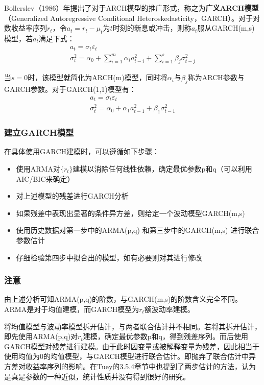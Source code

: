 \documentclass[11pt]{article}
\begin{document}
Bollerslev（1986）年提出了对于ARCH模型的推广形式，称之为\textbf{广义ARCH模型}（Generalized Autoregressive Conditional Heteroskedasticity，GARCH）。对于对数收益率序列$r_t$，令$a_t = r_t - \mu_t$为$t$时刻的新息或冲击，则称$a_t$服从GARCH(m,s)模型，若$a_t$满足下式：
\begin{gather*}
    a_t = \sigma_t \varepsilon_t \\
    \sigma_{t}^{2} = \alpha_0 + \sum_{i=1}^{m} \alpha_i a_{t-i}^2 + \sum_{i=1}^{s} \beta_j \sigma_{t-j}^{2}
\end{gather*}

当$s=0$时，该模型就简化为ARCH(m)模型，同时将$\alpha_i$与$\beta_j$称为ARCH参数与GARCH参数。对于GARCH(1,1)模型有：
\begin{gather*}
    a_t = \sigma_t \varepsilon_t \\
    \sigma_{t}^{2} = \alpha_0 + \alpha_1 a_{t-1}^2 + \beta_1 \sigma_{t-1}^{2}
\end{gather*}

\subsubsection{建立GARCH模型}

在具体使用GARCH建模时，可以遵循如下步骤：
\begin{itemize}
    \item 使用ARMA对$\{r_t\}$建模以消除任何线性依赖，确定最优参数p和q（可以利用AIC/BIC来确定）
    \item 对上述模型的残差进行GARCH分析
    \item 如果残差中表现出显著的条件异方差，则给定一个波动模型GARCH(m,s)
    \item 使用历史数据对第一步中的ARMA(p,q) 和第三步中的GARCH(m,s) 进行联合参数估计
    \item 仔细检验第四步中拟合出的模型，如有必要则对其进行修改
\end{itemize}

\subsubsection*{注意}

由上述分析可知ARMA(p,q)的阶数，与GARCH(m,s)的阶数含义完全不同。ARMA是对于均值建模，而GARCH模型为$r_t$额波动率建模。

将均值模型与波动率模型拆开估计，与两者联合估计并不相同。若将其拆开估计，即先使用ARMA(p,q)对$r_t$建模，确定最优参数p和q，得到残差序列。而后使用GARCH模型对残差进行建模。由于此时因变量或被解释变量为残差，因此相当于使用均值为0的均值模型，与GARCH模型进行联合估计。即抛弃了联合估计中异方差对收益率序列的影响。在Tuey的3.5.4章节中也提到了两步估计的方法，认为是真是参数的一种近似，统计性质并没有得到很好的研究。
\end{document}
